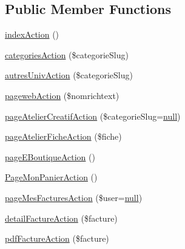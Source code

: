 \subsection*{Public Member Functions}
\begin{DoxyCompactItemize}
\item 
\hyperlink{class_acme_group_1_1_site_bundle_1_1_controller_1_1_site_controller_a84c57e7a0bdd1bcfc36e3a3b3a5bf9bb}{index\+Action} ()
\item 
\hyperlink{class_acme_group_1_1_site_bundle_1_1_controller_1_1_site_controller_a882fa4a9be6f73955dbe173a1e39634d}{categories\+Action} (\$categorie\+Slug)
\item 
\hyperlink{class_acme_group_1_1_site_bundle_1_1_controller_1_1_site_controller_ab8f4a2fb644f1e2a1763006d6475757a}{autres\+Univ\+Action} (\$categorie\+Slug)
\item 
\hyperlink{class_acme_group_1_1_site_bundle_1_1_controller_1_1_site_controller_af18d9f10f2154995545480c144f3b716}{pageweb\+Action} (\$nomrichtext)
\item 
\hyperlink{class_acme_group_1_1_site_bundle_1_1_controller_1_1_site_controller_a6f92b44133c32b9dd219df1fdb039fbc}{page\+Atelier\+Creatif\+Action} (\$categorie\+Slug=\hyperlink{validate_8js_afb8e110345c45e74478894341ab6b28e}{null})
\item 
\hyperlink{class_acme_group_1_1_site_bundle_1_1_controller_1_1_site_controller_adcb4b1947dfdadb5d0055c773281728a}{page\+Atelier\+Fiche\+Action} (\$fiche)
\item 
\hyperlink{class_acme_group_1_1_site_bundle_1_1_controller_1_1_site_controller_a59621673ffd81adcebc4324a52918a26}{page\+E\+Boutique\+Action} ()
\item 
\hyperlink{class_acme_group_1_1_site_bundle_1_1_controller_1_1_site_controller_a789902dc81cecb116efef5ddbb1917e9}{Page\+Mon\+Panier\+Action} ()
\item 
\hyperlink{class_acme_group_1_1_site_bundle_1_1_controller_1_1_site_controller_a5e75ff9c74a1c79217f48ec64384fc13}{page\+Mes\+Factures\+Action} (\$user=\hyperlink{validate_8js_afb8e110345c45e74478894341ab6b28e}{null})
\item 
\hyperlink{class_acme_group_1_1_site_bundle_1_1_controller_1_1_site_controller_a7215e4c5be1e93acd5870137a95ae07d}{detail\+Facture\+Action} (\$facture)
\item 
\hyperlink{class_acme_group_1_1_site_bundle_1_1_controller_1_1_site_controller_adfe9101cbb71c00300e764046daaa17f}{pdf\+Facture\+Action} (\$facture)
\item 

\end{DoxyCompactItemize}

